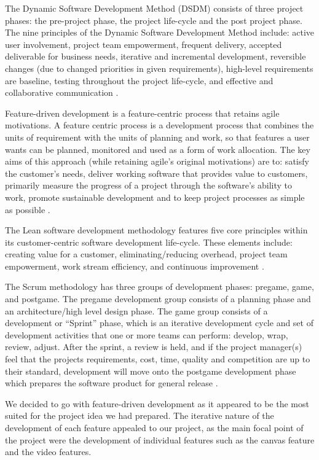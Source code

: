 The Dynamic Software Development Method (DSDM) consists of three project phases: the pre-project phase, the project life-cycle and the post project phase. The nine principles of the Dynamic Software Development Method include: active user involvement, project team empowerment, frequent delivery, accepted deliverable for business needs, iterative and incremental development, reversible changes (due to changed priorities in given requirements), high-level requirements are baseline, testing throughout the project life-cycle, and effective and collaborative communication \cite{voigt2004dynamic}.

Feature-driven development is a feature-centric process that retains agile motivations. A feature centric process is a development process that combines the units of requirement with the units of planning and work, so that features a user wants can be planned, monitored and used as a form of work allocation. The key aims of this approach (while retaining agile’s original motivations) are to: satisfy the customer’s needs, deliver working software that provides value to customers, primarily measure the progress of a project through the software’s ability to work, promote sustainable development and to keep project processes as simple as possible \cite{hunt2006feature}.

The Lean software development methodology features five core principles within its customer-centric software development life-cycle. These elements include: creating value for a customer, eliminating/reducing overhead, project team empowerment, work stream efficiency, and continuous improvement \cite{ebert2012lean}.

The Scrum methodology has three groups of development phases: pregame, game, and postgame. The pregame development group consists of a planning phase and an architecture/high level design phase. The game group consists of a development or “Sprint” phase, which is an iterative development cycle and set of development activities that one or more teams can perform: develop, wrap, review, adjust. After the sprint, a review is held, and if the project manager(s) feel that the projects requirements, cost, time, quality and competition are up to their standard, development will move onto the postgame development phase which prepares the software product for general release \cite{schwaber1997scrum}.

We decided to go with feature-driven development as it appeared to be the most suited for the project idea we had prepared. The iterative nature of the development of each feature appealed to our project, as the main focal point of the project were the development of individual features such as the canvas feature and the video features.

